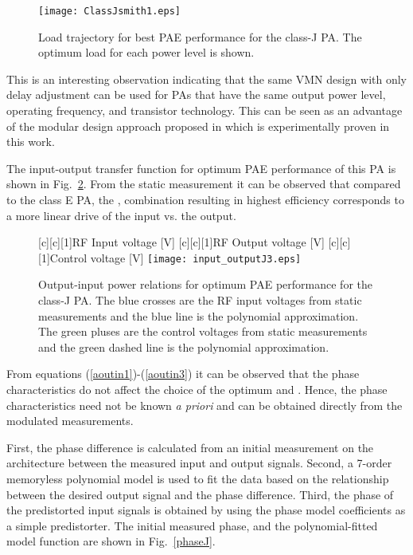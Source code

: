 \documentclass[10pt,journal]{IEEEtran}
\begin{document}
\begin{figure}
\centering
\texttt{[image: ClassJsmith1.eps]}
\caption{Load trajectory for best PAE performance for the class-J PA. The optimum load for each power level is shown.}
\label{classJsmith}
\end{figure}

This is an interesting observation indicating that the same VMN design with only delay adjustment can be used for PAs that have the same output power level, operating frequency, and transistor technology. This can be seen as an advantage of the modular design approach proposed in \cite{hosseinMTT} which is experimentally proven in this work.

The input-output transfer function for optimum PAE performance of this PA is shown in Fig.~\ref{out-inJ}. From the static measurement it can be observed that compared to the class E PA, the ,  combination resulting in highest efficiency corresponds to a more linear drive of the input vs. the output.

\begin{figure}
\centering
{}[c][c][1]{RF Input voltage  [V]} [c][c][1]{RF Output voltage  [V]} [c][c][1]{Control voltage  [V]}
\texttt{[image: input\_outputJ3.eps]}
\caption{Output-input power relations for optimum PAE performance for the class-J PA. The blue crosses are the RF input voltages from static measurements and the blue line is the polynomial approximation. The green pluses are the control voltages from static measurements and the green dashed line is the polynomial approximation.}
\label{out-inJ}
\end{figure}

From equations (\ref{aoutin1})-(\ref{aoutin3}) it can be observed that the phase characteristics do not affect the choice of the optimum  and . Hence, the phase characteristics need not be known \emph{a priori} and can be obtained directly from the modulated measurements.

First, the phase difference is calculated from an initial measurement on the architecture between the measured input and output signals. Second, a 7-order memoryless polynomial model is used to fit the data based on the relationship between the desired output signal and the phase difference. Third, the phase of the predistorted input signals is obtained by using the phase model coefficients as a simple predistorter. The initial measured phase, and the polynomial-fitted model function are shown in Fig.~\ref{phaseJ}.
\end{document}
